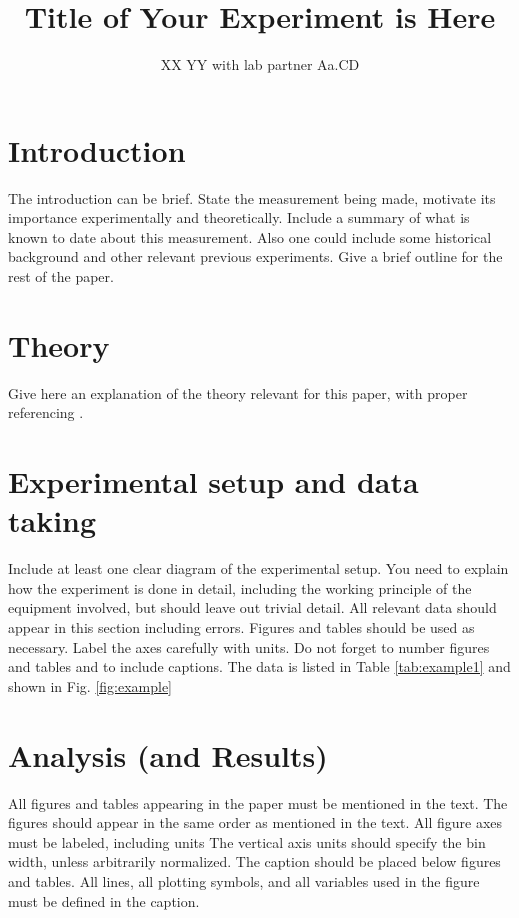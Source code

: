 \documentclass[11pt,a4paper]{advlabnote}
\title{Title of Your Experiment is Here}
\author{XX YY with lab partner Aa.CD}
\begin{document}
\tableofcontents
\clearpage

\section{Introduction}

The introduction can be brief.
State the measurement being made, motivate its importance
experimentally and theoretically. Include a summary of what is known
to date about this measurement. Also one could include some historical background and other relevant previous experiments. Give a brief outline for the rest of
the paper.

\section{Theory}

Give here an explanation of the theory relevant for this paper,
with proper referencing  \cite{ref:cdfhyp}.

\section{Experimental setup and data taking}

Include at least one clear diagram of the experimental setup. You need to explain
how the experiment is done in detail, including the working principle of the
equipment involved, but should leave out trivial detail. All relevant data should
appear in this section including errors.  Figures and tables
should be used as necessary. Label the axes carefully with units. Do not forget to
number figures and tables and to include captions. 
The data is listed in Table \ref{tab:example1} and shown in Fig. \ref{fig:example}

\section{Analysis (and Results)}

All figures and tables appearing in the paper must be mentioned in the text.
The figures should appear in the same order as mentioned in the text.
All figure axes must be labeled, including units
The vertical axis units should specify the bin width, unless
arbitrarily normalized. 
The caption should be placed below figures and tables.  All lines, all
plotting symbols, and all variables used in the figure must be defined
in the caption. 
\end{document}

